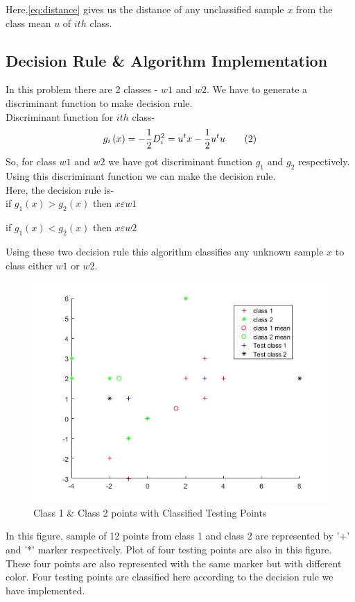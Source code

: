 Here,\eqref{eq:distance} gives us the distance of any unclassified sample $x$ from the class mean $u$ of $ith$ class.

\subsection{Decision Rule \& Algorithm Implementation}
In this problem there are 2 classes - $w1$ and $w2$. We have to generate a discriminant function to make decision rule.\\
Discriminant function for $ith$ class-\\
\[
    g_{i}\left ( x\right )=-\frac{1}{2}D_{i}^2={u^t x-\frac{1}{2}u^t u} \label{eq:ge} \tag{2}\\
\]
So, for class $w1$ and $w2$ we have got discriminant function $g_{1}$ and $g_{2}$ respectively. Using this discriminant function we can make the decision rule.\\
Here, the decision rule is-\\

if $g_{1}\left ( x\right ) > g_{2}\left ( x\right )$ then $x \varepsilon w1$

if $g_{1}\left ( x\right ) < g_{2}\left ( x\right )$ then $x \varepsilon w2$

Using these two decision rule this algorithm classifies any unknown sample $x$ to class either $w1$ or $w2$.\\
\begin{figure}[ht]
\begin{minipage}[c]{\linewidth}
\includegraphics[height=.9\linewidth,width=\linewidth]{testpoint.jpg}
\caption{Class 1 \& Class 2 points with Classified Testing Points}
\end{minipage}
\end{figure}
In this figure, sample of 12 points from class 1 and class 2 are represented by '+' and '*' marker respectively. Plot of four testing points are also in this figure. These four points are also represented with the same marker but with different color. Four testing points are classified here according to the decision rule we have implemented.
